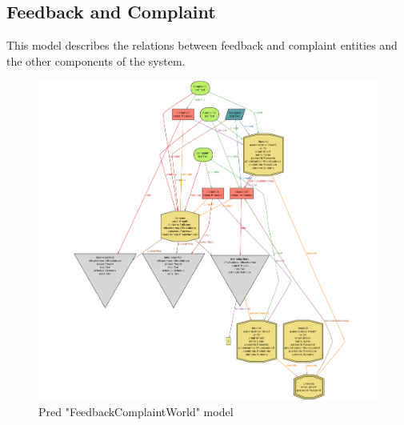 \subsection{Feedback and Complaint}
This model describes the relations between feedback and complaint entities and the other components of the system.
\begin{figure}
    \centering
    \includegraphics[width=0.5\linewidth]{Images/Alloy/ComplaintFeedback.png}
    \caption{Pred "FeedbackComplaintWorld" model}
    \label{fig:enter-label}
\end{figure}